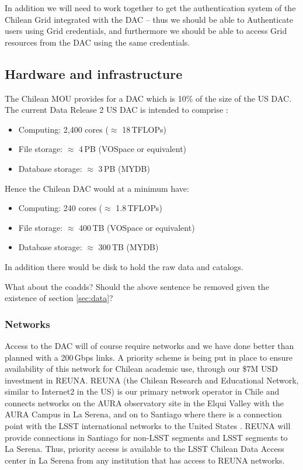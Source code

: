 In addition we will need to work together to get the authentication system of the Chilean Grid integrated with the DAC -- thus we should be able to Authenticate users using Grid credentials, and furthermore we should be able to access Grid resources from the DAC using the same credentials.


\subsection{Hardware and infrastructure}

The Chilean MOU provides for a DAC which is 10\% of the size of the US DAC.
The current Data Release 2 US DAC is intended to comprise :
\begin{itemize}
\item Computing: 2,400 cores ($\approx$ 18\,TFLOPs)
\item File storage: $\approx$ 4\,PB  (VOSpace or equivalent)
\item Database storage: $\approx$ 3\,PB (MYDB)

\end{itemize}

Hence the Chilean DAC would at a minimum have:
\begin{itemize}
\item Computing: 240 cores ($\approx$ 1.8\,TFLOPs)
\item File storage: $\approx$ 400\,TB  (VOSpace or equivalent)
\item Database storage: $\approx$ 300\,TB (MYDB)

\end{itemize}

In addition there would be disk to hold the raw data and catalogs.

\begin{draftnote}
What about the coadds? Should the above sentence be removed given the existence of section \ref{sec:data}?
\end{draftnote}

\subsubsection{Networks}

Access to the DAC will of course require networks and we have done better than planned with a 200\,Gbps links.
A priority scheme is being put in place to ensure availability of this network  for Chilean academic use, through our \$7M USD investment in REUNA.
REUNA (the Chilean Research and Educational Network, similar to Internet2 in the US) is our primary network operator in Chile and connects networks on the AURA observatory site in the Elqui Valley with the AURA Campus in La Serena, and on to Santiago where there is a connection point with the LSST international networks to the United States .
REUNA will provide connections in Santiago for non-LSST segments and LSST segments to La Serena.
Thus, priority access is available to the LSST Chilean Data Access center in La Serena from any institution that has access to REUNA networks.

